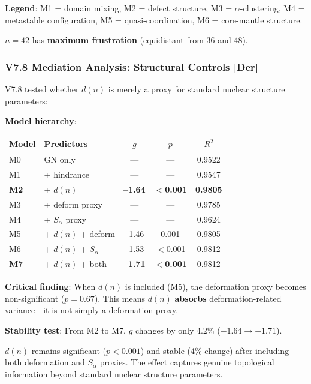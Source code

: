 \textbf{Legend}: M1 = domain mixing, M2 = defect structure, M3 = $\alpha$-clustering, M4 = metastable configuration, M5 = quasi-coordination, M6 = core-mantle structure.

$n = 42$ has \textbf{maximum frustration} (equidistant from 36 and 48).

\subsubsection{V7.8 Mediation Analysis: Structural Controls [Der]}
\label{subsubsec:v78-mediation}

V7.8 tested whether $d(n)$ is merely a proxy for standard nuclear structure parameters:

\textbf{Model hierarchy}:
\begin{center}
\begin{tabular}{llccc}
\hline
\textbf{Model} & \textbf{Predictors} & $g$ & $p$ & $R^2$ \\
\hline
M0 & GN only & --- & --- & 0.9522 \\
M1 & + hindrance & --- & --- & 0.9547 \\
\textbf{M2} & + $d(n)$ & \textbf{--1.64} & \textbf{$<$0.001} & \textbf{0.9805} \\
M3 & + deform proxy & --- & --- & 0.9785 \\
M4 & + $S_\alpha$ proxy & --- & --- & 0.9624 \\
M5 & + $d(n)$ + deform & --1.46 & 0.001 & 0.9805 \\
M6 & + $d(n)$ + $S_\alpha$ & --1.53 & $<$0.001 & 0.9812 \\
\textbf{M7} & + $d(n)$ + both & \textbf{--1.71} & \textbf{$<$0.001} & 0.9812 \\
\hline
\end{tabular}
\end{center}

\textbf{Critical finding}: When $d(n)$ is included (M5), the deformation proxy becomes non-significant ($p = 0.67$). This means $d(n)$ \textbf{absorbs} deformation-related variance---it is not simply a deformation proxy.

\textbf{Stability test}: From M2 to M7, $g$ changes by only 4.2\% ($-1.64 \to -1.71$).

\begin{tcolorbox}[colback=green!5!white, colframe=green!75!black, title=V7.8 Verdict {[Der]}]
$d(n)$ remains significant ($p < 0.001$) and stable (4\% change) after including both deformation and $S_\alpha$ proxies. The effect captures genuine topological information beyond standard nuclear structure parameters.
\end{tcolorbox}

